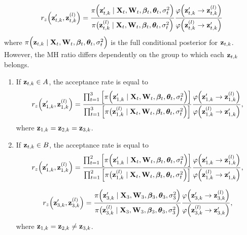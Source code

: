 \documentclass[a4paper, 11pt]{report}
\begin{document}
\begin{itemize}
\begin{enumerate}
\begin{equation*}
    r_z \Big( {\bf z}^\prime_{t,k},{\bf z}^{(l)}_{t,k} \Big) = \frac{\pi \Big( {\bf z}^\prime_{t,k} \mid {\bf X}_t,{\bf W}_t,{\boldsymbol \beta}_t,{\boldsymbol \theta}_t,\sigma^2_t \Big)}{\pi \big( {\bf z}^{(l)}_{t,k} \mid {\bf X}_t,{\bf W}_t,{\boldsymbol \beta}_t,{\boldsymbol \theta}_t,\sigma^2_t\Big)}\frac{\varphi \Big({\bf z}^\prime_{t,k}\rightarrow {\bf z}^{(l)}_{t,k} \Big)}{\varphi \Big({\bf z}^{(l)}_{t,k}\rightarrow {\bf z}^\prime_{t,k} \Big)}
\end{equation*}
where $\pi \Big( {\bf z}_{t,k} \mid {\bf X}_t,{\bf W}_t,{\boldsymbol \beta}_t,{\boldsymbol \theta}_t,\sigma^2_t \Big)$ is the full conditional posterior for ${\bf z}_{t,k}$. However, the MH ratio differs dependently on the group to which each ${\bf z}_{t,k}$ belongs.

\begin{enumerate}
    \item  If ${\bf z}_{t,k} \in A$, the acceptance rate is equal to
    \begin{equation*}
    r_z \Big( {\bf z}^\prime_{1,k},{\bf z}^{(l)}_{1,k} \Big) = \frac{\prod^3_{t=1} \Big[ \pi \Big( {\bf z}^\prime_{1,k} \mid {\bf X}_t,{\bf W}_t,{\boldsymbol \beta}_t,{\boldsymbol \theta}_t,\sigma^2_t \Big)\Big]}{\prod^3_{t=1} \Big[ \pi \big( {\bf z}^{(l)}_{1,k} \mid {\bf X}_t,{\bf W}_t,{\boldsymbol \beta}_t,{\boldsymbol \theta}_t,\sigma^2_t\Big) \Big]}\frac{\varphi \Big({\bf z}^\prime_{1,k}\rightarrow {\bf z}^{(l)}_{1,k} \Big)}{\varphi \Big({\bf z}^{(l)}_{1,k}\rightarrow {\bf z}^\prime_{1,k} \Big)},
    \end{equation*}
    where ${\bf z}_{1,k} = {\bf z}_{2,k} = {\bf z}_{3,k}$.
    
    \item If ${\bf z}_{t,k} \in B$, the acceptance rate is equal to
    \begin{equation*}
    r_z \Big( {\bf z}^\prime_{1,k},{\bf z}^{(l)}_{1,k} \Big) = \frac{\prod^2_{t=1} \Big[ \pi \Big( {\bf z}^\prime_{1,k} \mid {\bf X}_t,{\bf W}_t,{\boldsymbol \beta}_t,{\boldsymbol \theta}_t,\sigma^2_t \Big)\Big]}{\prod^2_{t=1} \Big[ \pi \big( {\bf z}^{(l)}_{1,k} \mid {\bf X}_t,{\bf W}_t,{\boldsymbol \beta}_t,{\boldsymbol \theta}_t,\sigma^2_t\Big) \Big]}\frac{\varphi \Big({\bf z}^\prime_{1,k}\rightarrow {\bf z}^{(l)}_{1,k} \Big)}{\varphi \Big({\bf z}^{(l)}_{1,k}\rightarrow {\bf z}^\prime_{1,k} \Big)},
    \end{equation*}
    
    \begin{equation*}
    r_z \Big( {\bf z}^\prime_{3,k},{\bf z}^{(l)}_{3,k} \Big) = \frac{\pi \Big( {\bf z}^\prime_{3,k} \mid {\bf X}_3,{\bf W}_3,{\boldsymbol \beta}_3,{\boldsymbol \theta}_3,\sigma^2_3 \Big)}{\pi \big( {\bf z}^{(l)}_{3,k} \mid {\bf X}_3,{\bf W}_3,{\boldsymbol \beta}_3,{\boldsymbol \theta}_3,\sigma^2_3\Big) }\frac{\varphi \Big({\bf z}^\prime_{3,k}\rightarrow {\bf z}^{(l)}_{3,k} \Big)}{\varphi \Big({\bf z}^{(l)}_{3,k}\rightarrow {\bf z}^\prime_{3,k} \Big)},
    \end{equation*}
    where ${\bf z}_{1,k} = {\bf z}_{2,k} \neq {\bf z}_{3,k} $.
    

\end{enumerate}
\end{enumerate}
\end{itemize}
\end{document}
